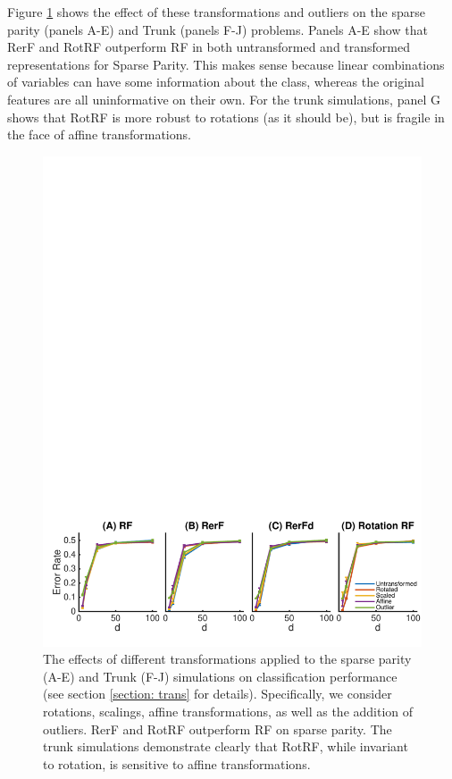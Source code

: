 \documentclass[10pt]{article}
\begin{document}
Figure \ref{transformations} shows the effect of these transformations and outliers on the sparse parity (panels A-E) and Trunk (panels F-J) problems. Panels A-E show that RerF and RotRF outperform RF in both untransformed and transformed representations for Sparse Parity. This makes sense because linear combinations of variables can have some information about the class, whereas the original features are all uninformative on their own. For the trunk simulations, panel G shows that RotRF is more robust to rotations (as it should be), but is fragile in the face of affine transformations.

\begin{figure}[ht]
\vskip 0.2in
\begin{center}
\centerline{\includegraphics[width=\columnwidth]{../Figures/pdf/Fig3_transformations}}
\caption{The effects of different transformations applied to the sparse parity (A-E) and Trunk (F-J) simulations on classification performance (see section \ref{section: trans} for details). Specifically, we consider rotations, scalings, affine transformations, as well as the addition of outliers. RerF and RotRF outperform RF on sparse parity. The trunk simulations demonstrate clearly that RotRF, while invariant to rotation, is sensitive to affine transformations.}
\label{transformations}
\end{center}
\vskip -0.2in
\end{figure}
\end{document}
